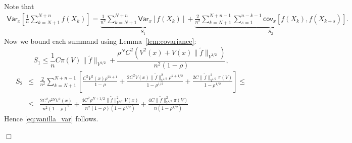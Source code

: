 \documentclass[bj]{imsart}
\def\PVar{\mathsf{Var}}
\def\PCov{\mathsf{cov}}
\newcommand{\proofendsign}{$\Box$}
\newenvironment{proof}{{\noindent \bf Proof }}
 {{\hspace*{\fill}\proofendsign\par\bigskip}}
\begin{document}
\begin{proof}
Note that
\begin{eqnarray*}
\PVar_x \left[ \frac{1}{n}\sum\limits_{k=N+1}^{N+n}f(X_k) \right] = \underbrace{\frac{1}{n^2}\sum\limits_{k=N+1}^{N+n}\PVar_x \left[ f(X_k) \right]}_{S_1} + \underbrace{\frac{2}{n^2}\sum\limits_{k=N+1}^{N+n-1}\sum\limits_{s=1}^{n-k-1}\PCov_x\left[f(X_k),f(X_{k+s})\right]}_{S_2}.
\end{eqnarray*}
Now we bound each summand using Lemma~\ref{lem:covariance}:
\[
S_1 \leq \frac{1}{n}C\pi(V)\|\tilde{f}\|_{V^{1/2}} + \frac{\rho^N C^2\left(V^2(x) + V(x)\|\tilde{f}\|_{V^{1/2}}\right)}{n^2(1-\rho)},
\]
\begin{eqnarray*}
S_2 & \leq & \frac{2}{n^2}\sum\limits_{k=N+1}^{N+n-1}\left[\frac{C^2V^2(x)\rho^{2k+1}}{1-\rho} + \frac{2C^2V(x)\|\tilde{f}\|^2_{V^{1/2}}\rho^{k+1/2}}{1-\rho^{1/2}} + \frac{2C\|\tilde{f}\|^2_{V^{1/2}}\pi(V)}{1-\rho^{1/2}}\right] \leq \\
& \leq & \frac{2C^2\rho^{2N}V^2(x)}{n^2(1-\rho)^2} + \frac{4C^2\rho^{N+1/2}\|\tilde{f}\|^2_{V^{1/2}}V(x)}{n^2(1-\rho)(1-\rho^{1/2})} + \frac{4C\|\tilde{f}\|^2_{V^{1/2}}\pi(V)}{n(1-\rho^{1/2})}
\end{eqnarray*}
Hence \eqref{eq:vanilla_var} follows.
\end{proof}



\end{document}
